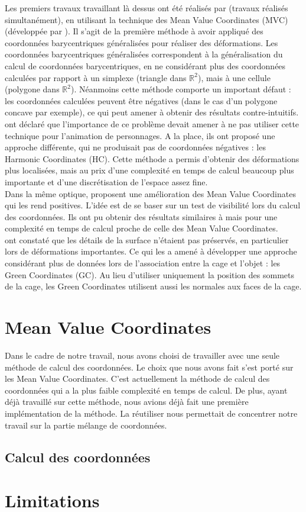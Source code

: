 Les premiers travaux travaillant là dessus ont été réalisés par \cite{JSW05} 
\cite{FKR05} (travaux réalisés simultanément), en utilisant la technique des
Mean Value Coordinates (MVC) (développée par \cite{Flo03}). Il s'agit de la
première méthode à avoir appliqué des coordonnées barycentriques généralisées
pour réaliser des déformations. Les coordonnées barycentriques généralisées
correspondent à la généralisation du calcul de coordonnées barycentriques, en ne
considérant plus des coordonnées calculées par rapport à un simplexe (triangle
dans $\mathbb{R}^2$), mais à une cellule (polygone dans $\mathbb{R}^2$).
Néanmoins cette méthode comporte un important défaut : les coordonnées calculées
peuvent être négatives (dans le cas d'un polygone concave par exemple), ce qui
peut amener à obtenir des résultats contre-intuitifs. \\

\cite{JMDGS07} ont déclaré que l'importance de ce problème devait amener à ne
pas utiliser cette technique pour l'animation de personnages. A la place, ils
ont proposé une approche différente, qui ne produisait pas de coordonnées
négatives : les Harmonic Coordinates (HC). Cette méthode a permis d'obtenir des
déformations plus localisées, mais au prix d'une complexité en temps de calcul
beaucoup plus importante et d'une discrétisation de l'espace assez fine. \\

Dans la même optique, \cite{LKCL07} proposent une amélioration des Mean Value
Coordinates qui les rend positives. L'idée est de se baser sur un test de
visibilité lors du calcul des coordonnées. Ils ont pu obtenir des résultats
similaires à \cite{JMDGS07} mais pour une complexité en temps de calcul proche
de celle des Mean Value Coordinates. \\

\cite{LLC08} ont constaté que les détails de la surface n'étaient pas préservés,
en particulier lors de déformations importantes. Ce qui les a amené à développer
une approche considérant plus de données lors de l'association entre la cage et
l'objet : les Green Coordinates (GC). Au lieu d'utiliser uniquement la position
des sommets de la cage, les Green Coordinates utilisent aussi les normales aux
faces de la cage.

\section{Mean Value Coordinates}

Dans le cadre de notre travail, nous avons choisi de travailler avec une seule
méthode de calcul des coordonnées. Le choix que nous avons fait s'est porté sur
les Mean Value Coordinates. C'est actuellement la méthode de calcul des
coordonnées qui a la plus faible complexité en temps de calcul. De plus, ayant
déjà travaillé sur cette méthode, nous avions déjà fait une première
implémentation de la méthode. La réutiliser nous permettait de concentrer notre
travail sur la partie mélange de coordonnées.

\subsection{Calcul des coordonnées}

\section{Limitations}